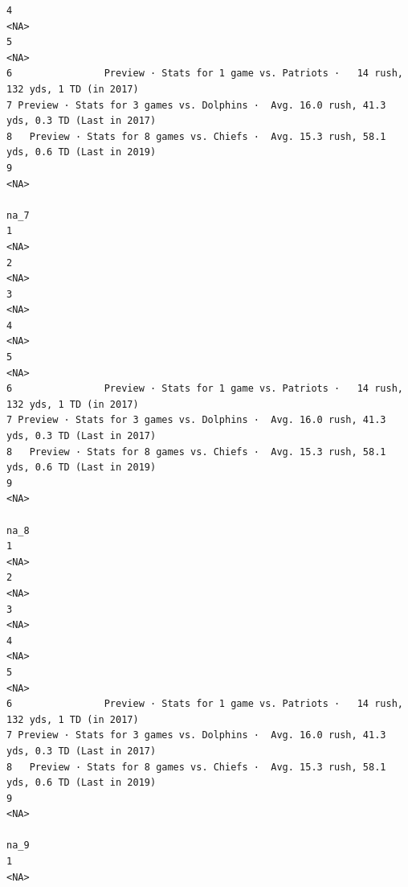 \documentclass[
]{article}
\begin{document}
\begin{verbatim}
4                                                                                        <NA>
5                                                                                        <NA>
6                Preview · Stats for 1 game vs. Patriots ·   14 rush, 132 yds, 1 TD (in 2017)
7 Preview · Stats for 3 games vs. Dolphins ·  Avg. 16.0 rush, 41.3 yds, 0.3 TD (Last in 2017)
8   Preview · Stats for 8 games vs. Chiefs ·  Avg. 15.3 rush, 58.1 yds, 0.6 TD (Last in 2019)
9                                                                                        <NA>
                                                                                         na_7
1                                                                                        <NA>
2                                                                                        <NA>
3                                                                                        <NA>
4                                                                                        <NA>
5                                                                                        <NA>
6                Preview · Stats for 1 game vs. Patriots ·   14 rush, 132 yds, 1 TD (in 2017)
7 Preview · Stats for 3 games vs. Dolphins ·  Avg. 16.0 rush, 41.3 yds, 0.3 TD (Last in 2017)
8   Preview · Stats for 8 games vs. Chiefs ·  Avg. 15.3 rush, 58.1 yds, 0.6 TD (Last in 2019)
9                                                                                        <NA>
                                                                                         na_8
1                                                                                        <NA>
2                                                                                        <NA>
3                                                                                        <NA>
4                                                                                        <NA>
5                                                                                        <NA>
6                Preview · Stats for 1 game vs. Patriots ·   14 rush, 132 yds, 1 TD (in 2017)
7 Preview · Stats for 3 games vs. Dolphins ·  Avg. 16.0 rush, 41.3 yds, 0.3 TD (Last in 2017)
8   Preview · Stats for 8 games vs. Chiefs ·  Avg. 15.3 rush, 58.1 yds, 0.6 TD (Last in 2019)
9                                                                                        <NA>
                                                                                         na_9
1                                                                                        <NA>

\end{verbatim}
\end{document}
